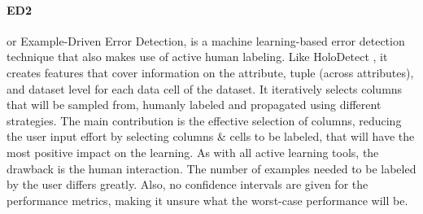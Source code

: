 \paragraph{ED2 \cite{Neutatz2019-aw}} or Example-Driven Error Detection, is a machine learning-based error detection technique that also makes use of active human labeling. 
Like HoloDetect \cite{Heidari2019-ox}, it creates features that cover information on the attribute, tuple (across attributes), and dataset level for each data cell of the dataset. It iteratively selects columns that will be sampled from, humanly labeled and propagated using different strategies. The main contribution is the effective selection of columns, reducing the user input effort by selecting columns \& cells to be labeled, that will have the most positive impact on the learning. As with all active learning tools, the drawback is the human interaction. The number of examples needed to be labeled by the user differs greatly. Also, no confidence intervals are given for the performance metrics, making it unsure what the worst-case performance will be. 